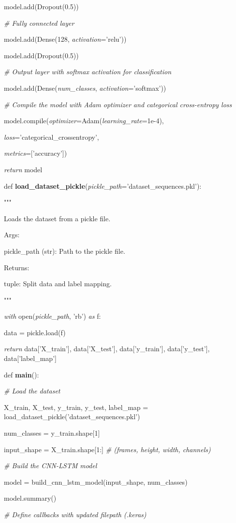 \documentclass[
]{article}
\begin{document}
model.add(Dropout(0.5))

\emph{\# Fully connected layer}

model.add(Dense(128, \emph{activation}='relu'))

model.add(Dropout(0.5))

\emph{\# Output layer with softmax activation for classification}

model.add(Dense(\emph{num\_classes}, \emph{activation}='softmax'))

\emph{\# Compile the model with Adam optimizer and categorical cross-entropy loss}

model.compile(\emph{optimizer}=Adam(\emph{learning\_rate}=1e-4),

\emph{loss}='categorical\_crossentropy',

\emph{metrics}={[}'accuracy'{]})

\emph{return} model

def \textbf{load\_dataset\_pickle}(\emph{pickle\_path}='dataset\_sequences.pkl'):

"""

Loads the dataset from a pickle file.

Args:

pickle\_path (str): Path to the pickle file.

Returns:

tuple: Split data and label mapping.

"""

\emph{with} open(\emph{pickle\_path}, 'rb') \emph{as} f:

data = pickle.load(f)

\emph{return} data{[}'X\_train'{]}, data{[}'X\_test'{]}, data{[}'y\_train'{]}, data{[}'y\_test'{]}, data{[}'label\_map'{]}

def \textbf{main}():

\emph{\# Load the dataset}

X\_train, X\_test, y\_train, y\_test, label\_map = load\_dataset\_pickle('dataset\_sequences.pkl')

num\_classes = y\_train.shape{[}1{]}

input\_shape = X\_train.shape{[}1:{]} \emph{\# (frames, height, width, channels)}

\emph{\# Build the CNN-LSTM model}

model = build\_cnn\_lstm\_model(input\_shape, num\_classes)

model.summary()

\emph{\# Define callbacks with updated filepath (.keras)}
\end{document}
